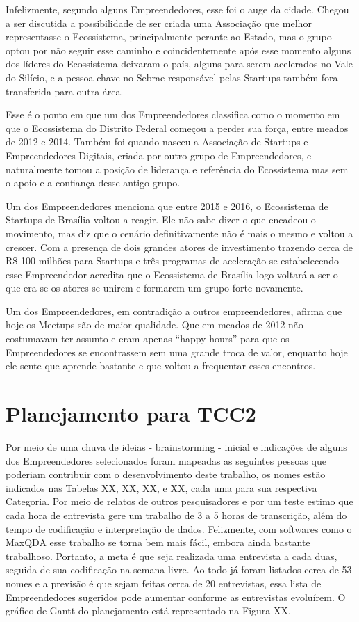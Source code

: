 Infelizmente, segundo alguns Empreendedores, esse foi o auge da cidade. Chegou a ser discutida a possibilidade de ser criada uma Associação que melhor representasse o Ecossistema, principalmente perante ao Estado, mas o grupo optou por não seguir esse caminho e coincidentemente após esse momento alguns dos líderes do Ecossistema deixaram o país, alguns para serem acelerados no Vale do Silício, e a pessoa chave no Sebrae responsável pelas Startups também fora transferida para outra área. 

Esse é o ponto em que um dos Empreendedores classifica como o momento em que o Ecossistema do Distrito Federal começou a perder sua força, entre meados de 2012 e 2014. Também foi quando nasceu a Associação de Startups e Empreendedores Digitais, criada por outro grupo de Empreendedores, e naturalmente tomou a posição de liderança e referência do Ecossistema mas sem o apoio e a confiança desse antigo grupo.

Um dos Empreendedores menciona que entre 2015 e 2016, o Ecossistema de Startups de Brasília voltou a reagir. Ele não sabe dizer o que encadeou o movimento, mas diz que o cenário definitivamente não é mais o mesmo e voltou a crescer. Com a presença de dois grandes atores de investimento trazendo cerca de R\$ 100 milhões para Startups e três programas de aceleração se estabelecendo esse Empreendedor acredita que o Ecossistema de Brasília logo voltará a ser o que era se os atores se unirem e formarem um grupo forte novamente.

Um dos Empreendedores, em contradição a outros empreendedores, afirma que hoje os Meetups são de maior qualidade. Que em meados de 2012 não costumavam ter assunto e eram apenas ``happy hours'' para que os Empreendedores se encontrassem sem uma grande troca de valor, enquanto hoje ele sente que aprende bastante e que voltou a frequentar esses encontros.

\section{Planejamento para TCC2}
\label{section:cronograma_tcc2}

Por meio de uma chuva de ideias - brainstorming - inicial e indicações de alguns dos Empreendedores selecionados foram mapeadas as seguintes pessoas que poderiam contribuir com o desenvolvimento deste trabalho, os nomes estão indicados nas Tabelas XX, XX, XX, e XX, cada uma para sua respectiva Categoria. Por meio de relatos de outros pesquisadores e por um teste estimo que cada hora de entrevista gere um trabalho de 3 a 5 horas de transcrição, além do tempo de codificação e interpretação de dados. Felizmente, com softwares como o MaxQDA esse trabalho se torna bem mais fácil, embora ainda bastante trabalhoso. Portanto, a meta é que seja realizada uma entrevista a cada duas, seguida de sua codificação na semana livre. Ao todo já foram listados cerca de 53 nomes e a previsão é que sejam feitas cerca de 20 entrevistas, essa lista de Empreendedores sugeridos pode aumentar conforme as entrevistas evoluírem. O gráfico de Gantt do planejamento está representado na Figura XX.

